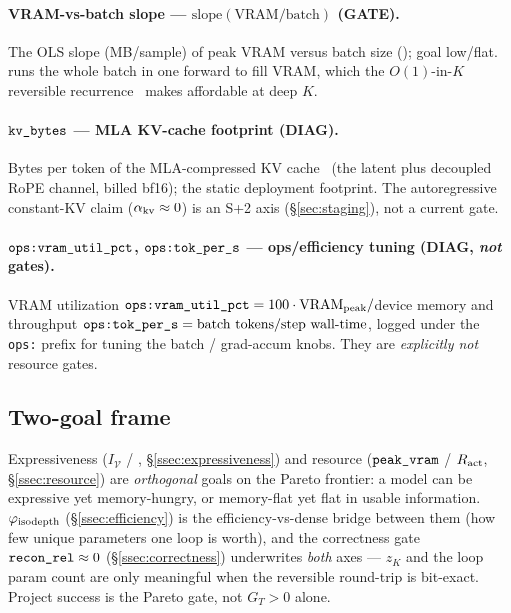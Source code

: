 \documentclass[11pt]{article}
\newcommand{\code}[1]{\texttt{#1}}
\newcommand{\vram}{\mathrm{VRAM}}
\newcommand{\GATE}{\textcolor{gate}{\textbf{GATE}}}
\newcommand{\DIAG}{\textcolor{diag}{\textbf{DIAG}}}
\begin{document}
\paragraph{VRAM-vs-batch slope --- \(\mathrm{slope}(\vram/\text{batch})\) (\GATE).}
The OLS slope (MB/sample) of peak VRAM versus batch size (\code{});
goal low/flat.  \code{} runs the whole batch in one forward to fill VRAM,
which the \(O(1)\)-in-\(K\) reversible recurrence~\cite{revnet,reformer,revffn,melt} makes affordable at deep \(K\).

\paragraph{\(\code{\detokenize{kv_bytes}}\) --- MLA KV-cache footprint (\DIAG).}
Bytes per token of the MLA-compressed KV cache~\cite{deepseekv2} (the latent plus decoupled RoPE channel, billed bf16);
the static deployment footprint.  The autoregressive constant-KV claim (\(\alpha_{\rm kv}\approx0\)) is
an S+2 axis (\S\ref{sec:staging}), not a current gate.

\paragraph{\(\code{\detokenize{ops:vram_util_pct}}\), \(\code{\detokenize{ops:tok_per_s}}\) --- ops/efficiency tuning (\DIAG, \emph{not} gates).}
VRAM utilization \(\code{\detokenize{ops:vram_util_pct}}=100\cdot\vram_{\rm peak}/\)device memory and
throughput \(\code{\detokenize{ops:tok_per_s}}=\text{batch tokens}/\text{step wall-time}\), logged under
the \code{ops:} prefix for tuning the batch / grad-accum knobs.  They are \emph{explicitly not}
resource gates.

\subsection{Two-goal frame}
\label{ssec:two-goal}
Expressiveness (\(I_{\mathcal V}\) / \code{}, \S\ref{ssec:expressiveness})
and resource (\(\code{\detokenize{peak_vram}}\) / \(R_{\rm act}\), \S\ref{ssec:resource}) are
\emph{orthogonal} goals on the Pareto frontier: a model can be expressive yet memory-hungry, or
memory-flat yet flat in usable information.  \(\varphi_{\rm isodepth}\) (\S\ref{ssec:efficiency}) is the
efficiency-vs-dense bridge between them (how few unique parameters one loop is worth), and the
correctness gate \(\code{\detokenize{recon_rel}}\approx0\) (\S\ref{ssec:correctness}) underwrites
\emph{both} axes --- \(z_K\) and the loop param count are only meaningful when the reversible round-trip
is bit-exact.  Project success is the Pareto gate, not \(G_T>0\) alone.
\end{document}
